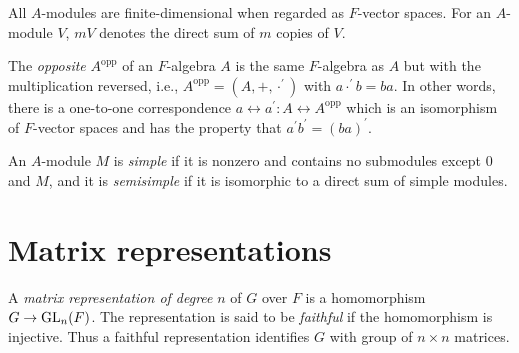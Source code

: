 \documentclass[a4paper,11pt,final]{memoir}%
\theoremstyle{nonumberplain}
\begin{document}
All $A$-modules are finite-dimensional when regarded as $F$-vector spaces. For
an $A$-module $V$, $mV$ denotes the direct sum of $m$ copies of $V$.

The \emph{opposite}%
$A^{\mathrm{opp}}$ of an $F$-algebra $A$ is the same $F$-algebra as $A$ but
with the multiplication reversed, i.e., $A^{\mathrm{opp}}=(A,+,\cdot^{\prime
})$ with $a\cdot^{\prime}b=ba$. In other words, there is a one-to-one
correspondence $a\leftrightarrow a^{\prime}\colon A\leftrightarrow
A^{\mathrm{opp}}$ which is an isomorphism of $F$-vector spaces and has the
property that $a^{\prime}b^{\prime}=(ba)^{\prime}$.

An $A$-module $M$ is \emph{simple}
%
if it is nonzero and contains no submodules except $0$ and $M$, and it is
\emph{semisimple}
%
if it is isomorphic to a direct sum of simple modules.

\section{Matrix representations}

A \emph{matrix representation of degree }$n$
%
of $G$ over $F$ is a homomorphism $G\rightarrow\operatorname{GL}_{n}(F)$. The representation
is said to be \emph{faithful}
%
if the homomorphism is injective. Thus a faithful representation identifies
$G$ with group of $n\times n$ matrices.
\end{document}
